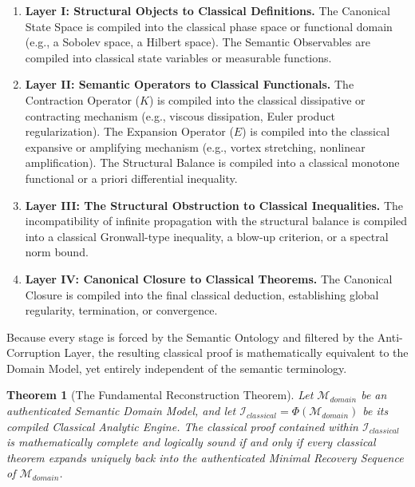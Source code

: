 \documentclass[12pt,openany]{extbook}
\theoremstyle{plain}
\newtheorem{theorem}{Theorem}[chapter]
\theoremstyle{definition}
\begin{document}
\begin{enumerate}
    \item \textbf{Layer I: Structural Objects to Classical Definitions.} The Canonical State Space is compiled into the classical phase space or functional domain (e.g., a Sobolev space, a Hilbert space). The Semantic Observables are compiled into classical state variables or measurable functions.
    \item \textbf{Layer II: Semantic Operators to Classical Functionals.} The Contraction Operator ($K$) is compiled into the classical dissipative or contracting mechanism (e.g., viscous dissipation, Euler product regularization). The Expansion Operator ($E$) is compiled into the classical expansive or amplifying mechanism (e.g., vortex stretching, nonlinear amplification). The Structural Balance is compiled into a classical monotone functional or a priori differential inequality.
    \item \textbf{Layer III: The Structural Obstruction to Classical Inequalities.} The incompatibility of infinite propagation with the structural balance is compiled into a classical Gronwall-type inequality, a blow-up criterion, or a spectral norm bound.
    \item \textbf{Layer IV: Canonical Closure to Classical Theorems.} The Canonical Closure is compiled into the final classical deduction, establishing global regularity, termination, or convergence.
\end{enumerate}

Because every stage is forced by the Semantic Ontology and filtered by the Anti-Corruption Layer, the resulting classical proof is mathematically equivalent to the Domain Model, yet entirely independent of the semantic terminology. 

\begin{theorem}[The Fundamental Reconstruction Theorem]
Let $\mathcal{M}_{domain}$ be an authenticated Semantic Domain Model, and let $\mathcal{I}_{classical} = \Phi(\mathcal{M}_{domain})$ be its compiled Classical Analytic Engine. The classical proof contained within $\mathcal{I}_{classical}$ is mathematically complete and logically sound if and only if every classical theorem expands uniquely back into the authenticated Minimal Recovery Sequence of $\mathcal{M}_{domain}$.
\end{theorem}
\end{document}
